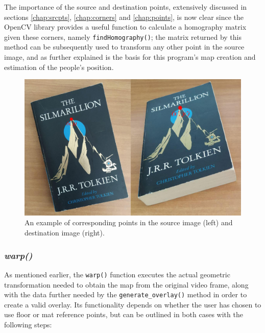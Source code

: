 \documentclass[12pt]{article}
\begin{document}
The importance of the source and destination points, extensively discussed in sections \ref{chap:srcpts}, \ref{chap:corners} and \ref{chap:points}, is now clear since the OpenCV library provides a useful function to calculate a homography matrix given these corners, namely \lstinline{findHomography()}; the matrix returned by this method can be subsequently used to transform any other point in the source image, and as further explained is the basis for this program's map creation and estimation of the people's position.

\begin{figure}[H]
\begin{center}
    \includegraphics[height=0.6\linewidth]{img/corrpoints.jpg}
\end{center}
   \caption{An example of corresponding points in the source image (left) and destination image (right).}
\label{fig:corrpoints}
\end{figure}

\subsubsection{\textit{warp()}}
\label{chap:warp}
As mentioned earlier, the \lstinline{warp()} function executes the actual geometric transformation needed to obtain the map from the original video frame, along with the data further needed by the \lstinline{generate_overlay()} method in order to create a valid overlay. Its functionality depends on whether the user has chosen to use floor or mat reference points, but can be outlined in both cases with the following steps:
\end{document}
